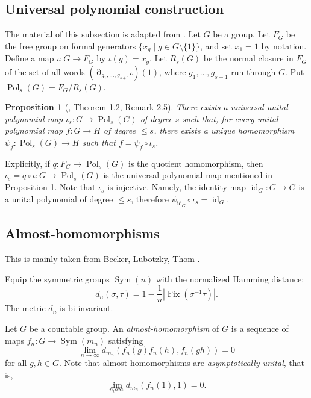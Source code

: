 \documentclass[a4paper,12pt]{amsart}
\theoremstyle{plain}
\newtheorem{proposition}[subsection]{{\bf Proposition}}
\theoremstyle{definition}
\theoremstyle{remark}
\numberwithin{equation}{subsection}
\DeclareMathOperator{\Sym}{Sym}
\DeclareMathOperator{\Fix}{Fix}
\DeclareMathOperator{\id}{id}
\DeclareMathOperator{\Pold}{Pol}
\DeclareMathOperator{\mypartial}{\partial}
\begin{document}
\subsection{Universal polynomial construction}
\label{ss:universal_prelim}

The material of this subsection is adapted from \cite{JT24}. Let $G$ be a group. Let $F_G$ be the free group on formal generators $\{ x_g\mid g\in G\setminus\{1\}\}$, and set $x_1=1$ by notation. Define a map $\iota :G\to F_G$ by $\iota(g)=x_g$.
Let $R_s(G)$ be the normal closure in $F_G$ of the set of all words $(\mypartial_{g_1,\ldots ,g_{s+1}}\iota)(1)$, where $g_1,\ldots ,g_{s+1}$ run through $G$. Put
$\Pold_s(G)=F_G/R_s(G)$.

\begin{proposition}[\cite{JT24}, Theorem 1.2, Remark 2.5]
    \label{prop:Pold}
    There exists a universal unital polynomial map $\iota_s:G\to\Pold_s(G)$ of degree $s$ such that, 
    for every unital polynomial map $f:G\to H$ of degree $\le s$, there exists a unique homomorphism $\psi_f: \Pold_s(G)\to H$ such that $f=\psi_f\circ \iota_s$.
\end{proposition}

Explicitly, if $q:F_G\to\Pold_s(G)$ is the quotient homomorphism, then $\iota_s=q\circ\iota:G\to\Pold_s(G)$ is the universal polynomial map mentioned in Proposition \ref{prop:Pold}. 
Note that $\iota_s$ is injective. Namely, the identity map $\id_G:G\to G$ is a unital polynomial of degree $\le s$, therefore $\psi_{\id_G}\circ\iota_s=\id_G$.

\subsection{Almost-homomorphisms}
\label{ss:almosthom_prelim}
 
This is mainly taken from Becker, Lubotzky, Thom \cite{BLT19}.

Equip the symmetric groups $\Sym(n)$ with the normalized Hamming distance:
$$d_n(\sigma,\tau)=1-\frac{1}{n}|\Fix(\sigma^{-1}\tau)|.$$
The metric $d_n$ is bi-invariant.

Let $G$ be a countable group. 
An \emph{almost-homomorphism} of $G$ is a sequence of maps 
$f_n:G\to\Sym (m_n)$ satisfying
$$\lim_{n\to\infty} d_{m_n}(f_n(g)f_n(h),f_n(gh))=0$$
for all $g,h\in G$. Note that almost-homomorphisms are \emph{asymptotically unital}, that is,
$$\lim_{n_to\infty} d_{m_n}(f_n(1),1)=0.$$
\end{document}
